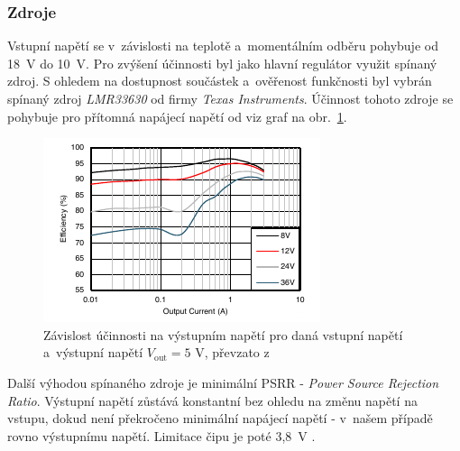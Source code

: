 \documentclass[twoside]{ctuthesis}
\newcommand{\mt}[1]{\text{#1}}
\theoremstyle{plain}
\theoremstyle{definition}
\theoremstyle{note}
\begin{document}
			\subsubsection{Zdroje}
			Vstupní napětí se v~závislosti na teplotě a~momentálním odběru pohybuje od 18~V do 10~V. Pro zvýšení účinnosti byl jako hlavní regulátor využit spínaný zdroj. S ohledem na dostupnost součástek a~ověřenost funkčnosti byl vybrán spínaný zdroj \textit{LMR33630} od firmy \textit{Texas Instruments}. Účinnost tohoto zdroje se pohybuje pro přítomná napájecí napětí od viz graf na obr.~\ref{graf:lmr}.
			\begin{figure}[hbtp]
				\centering
				\includegraphics[width=.6\textwidth]{Graphs/lmr33630eff.pdf}
				\caption{Závislost účinnosti na výstupním napětí pro daná vstupní napětí a~výstupní napětí $V_\mt{out}= 5\mt{ V}$, převzato z \cite{dsh_lmr}}
				\label{graf:lmr}
			\end{figure}

			Další výhodou spínaného zdroje je minimální PSRR - \textit{Power Source Rejection Ratio}. Výstupní napětí zůstává konstantní bez ohledu na změnu napětí na vstupu, dokud není překročeno minimální napájecí napětí - v~našem případě rovno výstupnímu napětí. Limitace čipu je poté 3{,}8~V \cite{dsh_lmr}.
			
\end{document}
